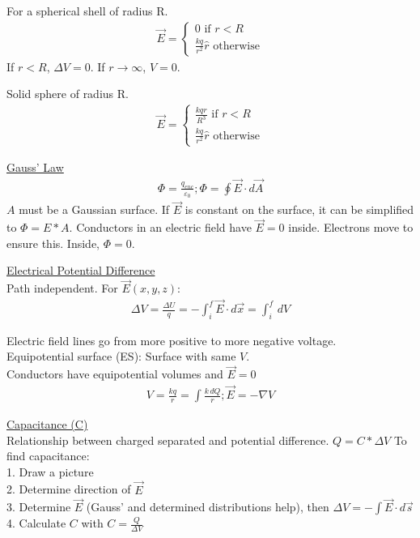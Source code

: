 \documentclass[8pt]{minimal}
\begin{document}
For a spherical shell of radius R.
\begin{gather*}
    \vec{E} = \left\{ \begin{matrix}
        0 \text{ if } r < R\\
        \frac{kq}{r^2}\hat{r} \text{ otherwise}
    \end{matrix} \right.
\end{gather*}
If $r < R$, $\Delta V = 0$. If $r \to \infty$, $V = 0$.

Solid sphere of radius R.
\begin{gather*}
    \vec{E} = \left\{ \begin{matrix}
        \frac{kqr}{R^3} \text{ if } r < R\\
        \frac{kq}{r^2}\hat{r} \text{ otherwise}
    \end{matrix} \right.
\end{gather*}


\underline{Gauss' Law}
\begin{gather*}
    \Phi = \frac{q_{enc}}{\varepsilon_0};
    \Phi = \oint \vec{E} \cdot d\vec{A}
\end{gather*}
$A$ must be a Gaussian surface. 
If $\vec{E}$ is constant on the surface, it can be simplified to $\Phi = E*A$.
Conductors in an electric field have $\vec{E} = 0$ inside. 
Electrons move to ensure this. 
Inside, $\Phi = 0$.


\underline{Electrical Potential Difference}\\
Path independent. For $\vec{E}(x,y,z)$:
\begin{gather*}
    \Delta V = \frac{\Delta U}{q} = -\int_{i}^{f} \vec{E}\cdot d\vec{x} = \int_{i}^{f}\,dV
\end{gather*}

Electric field lines go from more positive to more negative voltage.\\
Equipotential surface (ES): Surface with same $V$.\\
Conductors have equipotential volumes and $\vec{E} = 0$
\begin{gather*}
    V = \frac{kq}{r} = \int \frac{k\,dQ}{r};
    \vec{E} = -\nabla V
\end{gather*}


\underline{Capacitance (C)}\\
Relationship between charged separated and potential difference. $Q = C*\Delta V$
To find capacitance:\\
1. Draw a picture\\
2. Determine direction of $\vec{E}$\\
3. Determine $\vec{E}$ (Gauss' and determined distributions help), then $\Delta V = -\int \vec{E}\cdot d\vec{s}$\\
4. Calculate $C$ with $C = \frac{Q}{\Delta V}$
\end{document}
